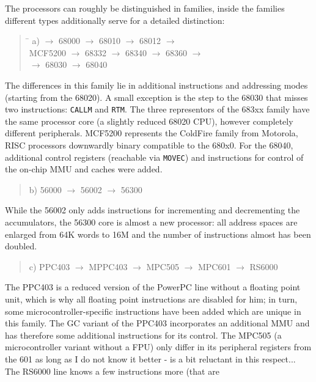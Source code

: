 \documentclass[12pt,twoside]{report}
\newcommand{\tty}[1]{{\tt #1}}
\begin{document}
The processors can roughly be distinguished in families, inside the
families different types additionally serve for a detailed
distinction:
\begin{quote}
\begin{tabbing}
\hspace{0.7cm} \= \kill
a)  $\rightarrow$ 68000 $\rightarrow$ 68010 $\rightarrow$ 68012 $\rightarrow$ \\
   \> MCF5200 $\rightarrow$ 68332 $\rightarrow$ 68340 $\rightarrow$ 68360 $\rightarrow$ \\
    $\rightarrow$ 68030 $\rightarrow$ 68040
\end{tabbing}
\end{quote}
The differences in this family lie in additional instructions and
addressing modes (starting from the 68020).  A small exception is the step
to the 68030 that misses two instructions: \tty{CALLM} and \tty{RTM}.  The
three representors of the 683xx family have the same processor core (a
slightly reduced 68020 CPU), however completely different peripherals. 
MCF5200 represents the ColdFire family from Motorola, RISC processors
downwardly binary compatible to the 680x0.  For the 68040, additional
control registers (reachable via \tty{MOVEC}) and instructions for control
of the on-chip MMU and caches were added.
\begin{quote}
b) 56000 $\longrightarrow$ 56002 $\longrightarrow$ 56300
\end{quote}
While the 56002 only adds instructions for incrementing and decrementing
the accumulators, the 56300 core is almost a new processor: all address
spaces are enlarged from 64K words to 16M and the number of instructions
almost has been doubled.
\begin{quote}
c) PPC403 $\rightarrow$ MPPC403 $\rightarrow$ MPC505 $\rightarrow$ MPC601 $\rightarrow$ RS6000
\end{quote}
The PPC403 is a reduced version of the PowerPC line without a floating
point unit, which is why all floating point instructions are disabled for
him; in turn, some microcontroller-specific instructions have been added
which are unique in this family.  The GC variant of the PPC403
incorporates an additional MMU and has therefore some additional
instructions for its control.  The MPC505 (a microcontroller variant
without a FPU) only differ in its peripheral registers from the 601 as
long as I do not know it better - \cite{Mot505} is a bit reluctant in this
respect...  The RS6000 line knows a few instructions more (that are
\end{document}
